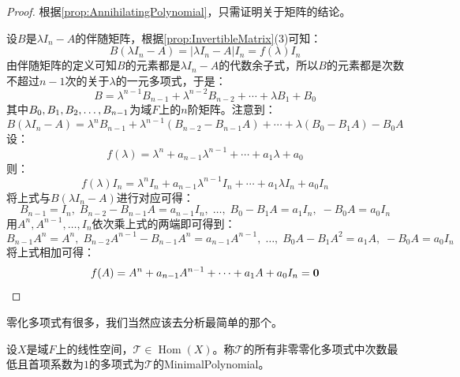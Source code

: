 \begin{proof}
	根据\cref{prop:AnnihilatingPolynomial}，只需证明关于矩阵的结论。\par
	设$B$是$\lambda I_n-A$的伴随矩阵，根据\cref{prop:InvertibleMatrix}(3)可知：
	\begin{equation*}
		B(\lambda I_n-A)=|\lambda I_n-A|I_n=f(\lambda)I_n
	\end{equation*}
	由伴随矩阵的定义可知$B$的元素都是$\lambda I_n-A$的代数余子式，所以$B$的元素都是次数不超过$n-1$次的关于$\lambda$的一元多项式，于是：
	\begin{equation*}
		B=\lambda^{n-1}B_{n-1}+\lambda^{n-2}B_{n-2}+\cdots+\lambda B_1+B_0
	\end{equation*}
	其中$B_0,B_1, B_2, \dots, B_{n-1}$为域$F$上的$n$阶矩阵。注意到：
	\begin{equation*}
		B(\lambda I_n-A)=\lambda^nB_{n-1}+\lambda^{n-1}(B_{n-2}-B_{n-1}A)+\cdots+\lambda(B_0-B_1A)-B_0A
	\end{equation*}
	设：
	\begin{equation*}
		f(\lambda)=\lambda^n+a_{n-1}\lambda^{n-1}+\cdots+a_1\lambda+a_0
	\end{equation*}
	则：
	\begin{equation*}
		f(\lambda)I_n=\lambda^nI_n+a_{n-1}\lambda^{n-1}I_n+\cdots+a_1\lambda I_n+a_0I_n
	\end{equation*}	
	将上式与$B(\lambda I_n-A)$进行对应可得：
	\begin{equation*}
		B_{n-1}=I_n,\;B_{n-2}-B_{n-1}A=a_{n-1}I_n,\;\dots,\;B_0-B_1A=a_1I_n,\;-B_0A=a_0I_n
	\end{equation*}
	用$A^n,A^{n-1},\dots,I_n$依次乘上式的两端即可得到：
	\begin{equation*}
		B_{n-1}A^n=A^n,\;B_{n-2}A^{n-1}-B_{n-1}A^n=a_{n-1}A^{n-1},\;\dots,\;B_0A-B_1A^2=a_1A,\;-B_0A=a_0I_n
	\end{equation*}
	将上式相加可得：
	\begin{equation*}
		f(A)=A^n+a_{n-1}A^{n-1}+\cdots+a_1A+a_0I_n=\mathbf{0}\qedhere
	\end{equation*}
\end{proof}
零化多项式有很多，我们当然应该去分析最简单的那个。
\begin{definition}
	设$X$是域$F$上的线性空间，$\mathcal{T}\in\operatorname{Hom}(X)$。称$\mathcal{T}$的所有非零零化多项式中次数最低且首项系数为$1$的多项式为$\mathcal{T}$的\gls{MinimalPolynomial}。
\end{definition}
